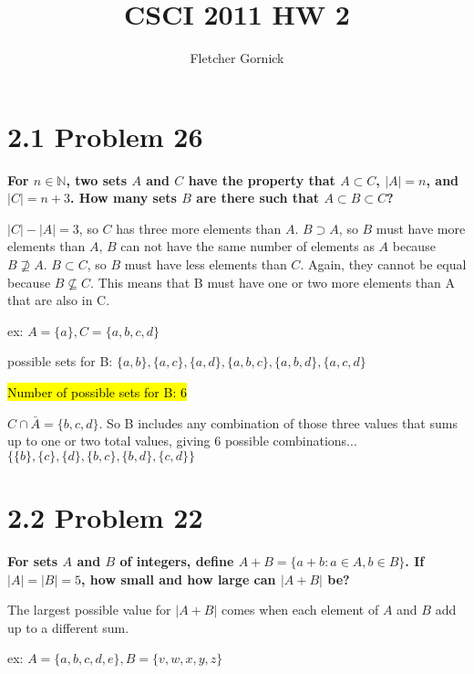 \documentclass[10pt]{article}
\title{CSCI 2011 HW 2}
\author{Fletcher Gornick}
\def \n {\par \vspace{\baselineskip}}
\begin{document}
\maketitle

\section{2.1 Problem 26}
\textbf{For $n \in \mathbb{N}$, two sets $A$ and $C$ have the property that $A \subset C$, 
$|A| = n$, and $|C| = n+3$. How many sets $B$ are there such that $A \subset B \subset C$?}

\n

$|C|-|A| = 3$, so $C$ has three more elements than $A$. $B \supset A$, so $B$ must have
more elements than $A$, $B$ can not have the same number of elements as $A$ because 
$B \not\supseteq A$. $B \subset C$, so $B$ must have less elements than $C$. Again, they
cannot be equal because $B \not\subseteq C$.  This means that B must have one or two more
elements than A that are also in C.

\n

ex: $A = \{a\}, C = \{a,b,c,d\}$

possible sets for B: $\{a,b\}, \{a,c\}, \{a,d\}, \{a,b,c\}, \{a,b,d\}, \{a,c,d\}$

\hl{Number of possible sets for B: 6}

\n

$C \cap \bar A = \{b,c,d\}$. So B includes any combination of those three values that 
sums up to one or two total values, giving 6 possible combinations...
$\big\{\{b\},\{c\},\{d\},\{b,c\},\{b,d\},\{c,d\}\big\}$


\section{2.2 Problem 22}
\textbf{For sets $A$ and $B$ of integers, define $A+B = \{a+b : a \in A, b \in B\}$.
If $|A| = |B| = 5$, how small and how large can $|A + B|$ be?}

\par \vspace{\baselineskip}

The largest possible value for $|A+B|$ comes when each element of $A$ and $B$ add up 
to a different sum.

\par \vspace{\baselineskip}

ex: $A = \{a,b,c,d,e\}, B = \{v,w,x,y,z\}$
\end{document}
